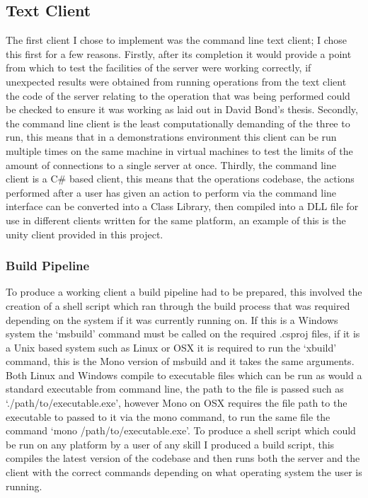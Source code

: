 \documentclass{article}
\begin{document}
\subsection{Text Client}
The first client I chose to implement was the command line text client; I chose this first for a few reasons. Firstly, after its completion it would provide a point from which to test the facilities of the server were working correctly, if unexpected results were obtained from running operations from the text client the code of the server relating to the operation that was being performed could be checked to ensure it was working as laid out in David Bond’s thesis. Secondly, the command line client is the least computationally demanding of the three to run, this means that in a demonstrations environment this client can be run multiple times on the same machine in virtual machines to test the limits of the amount of connections to a single server at once. Thirdly, the command line client is a C\# based client, this means that the operations codebase, the actions performed after a user has given an action to perform via the command line interface can be converted into a Class Library, then compiled into a DLL file for use in different clients written for the same platform, an example of this is the unity client provided in this project. 
\subsubsection{Build Pipeline}
To produce a working client a build pipeline had to be prepared, this involved the creation of a shell script which ran through the build process that was required depending on the system if it was currently running on. If this is a Windows system the ‘msbuild’ command must be called on the required .csproj files, if it is a Unix based system such as Linux or OSX it is required to run the ‘xbuild’ command, this is the Mono version of msbuild and it takes the same arguments. Both Linux and Windows compile to executable files which can be run as would a standard executable from command line, the path to the file is passed such as ‘./path/to/executable.exe’, however Mono on OSX requires the file path to the executable to passed to it via the mono command, to run the same file the command ‘mono /path/to/executable.exe’. To produce a shell script which could be run on any platform by a user of any skill I produced a build script, this compiles the latest version of the codebase and then runs both the server and the client with the correct commands depending on what operating system the user is running.
\end{document}
